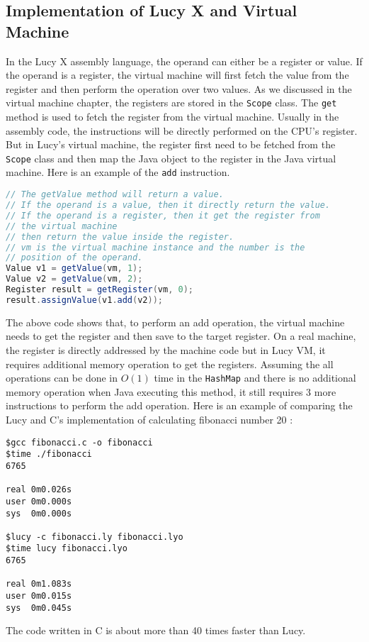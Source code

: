 \subsection{Implementation of Lucy X and Virtual Machine}
In the Lucy X assembly language, the operand can either be a register or value. If the operand is a register, the virtual machine will first fetch the value from the register and then perform the operation over two values. As we discussed in the virtual machine chapter, the registers are stored in the \texttt{Scope} class. The \texttt{get} method is used to fetch the register from the virtual machine. Usually in the assembly code, the instructions will be directly performed on the CPU's register. But in Lucy's virtual machine, the register first need to be fetched from the \texttt{Scope} class and then map the Java object to the register in the Java virtual machine. Here is an example of the \texttt{add} instruction.
\begin{lstlisting}[language=Java]
// The getValue method will return a value.
// If the operand is a value, then it directly return the value.
// If the operand is a register, then it get the register from
// the virtual machine
// then return the value inside the register.
// vm is the virtual machine instance and the number is the
// position of the operand.
Value v1 = getValue(vm, 1);
Value v2 = getValue(vm, 2);
Register result = getRegister(vm, 0);
result.assignValue(v1.add(v2));
\end{lstlisting}
The above code shows that, to perform an add operation, the virtual machine needs to get the register and then save to the target register. On a real machine, the register is directly addressed by the machine code but in Lucy VM, it requires additional memory operation to get the registers. Assuming the all operations can be done in $O(1)$ time in the \texttt{HashMap} and there is no additional memory operation when Java executing this method, it still requires 3 more instructions to perform the add operation. Here is an example of comparing the Lucy and C's implementation of calculating fibonacci number 20 :
\begin{lstlisting}
$gcc fibonacci.c -o fibonacci
$time ./fibonacci
6765

real 0m0.026s
user 0m0.000s
sys  0m0.000s

$lucy -c fibonacci.ly fibonacci.lyo
$time lucy fibonacci.lyo
6765

real 0m1.083s
user 0m0.015s
sys  0m0.045s
\end{lstlisting}
The code written in C is about more than 40 times faster than Lucy.

